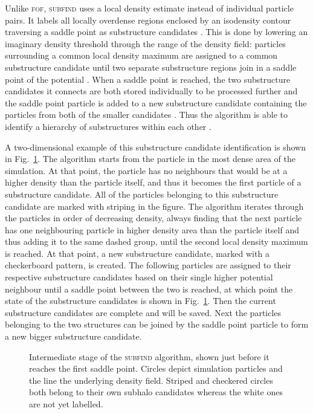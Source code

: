 \documentclass[english, oneside]{HYgradu}
\begin{document}
Unlike \textsc{fof}, \textsc{subfind} uses a local density estimate instead of individual particle pairs. It labels all locally overdense regions enclosed by an isodensity contour traversing a saddle point as substructure candidates \citep{springel2001populating}. This is done by lowering an imaginary density threshold through the range of the density field: particles surrounding a common local density maximum are assigned to a common substructure candidate until two separate substructure regions join in a saddle point of the potential \citep{springel2001populating}. When a saddle point is reached, the two substructure candidates it connects are both stored individually to be processed further and the saddle point particle is added to a new substructure candidate containing the particles from both of the smaller candidates \citep{springel2001populating}. Thus the algorithm is able to identify a hierarchy of substructures within each other \citep{springel2001populating}.

A two-dimensional example of this substructure candidate identification is shown in Fig.\ \ref{fig:subfind}. The algorithm starts from the particle in the most dense area of the simulation. At that point, the particle has no neighbours that would be at a higher density than the particle itself, and thus it becomes the first particle of a substructure candidate. All of the particles belonging to this substructure candidate are marked with striping in the figure. The algorithm iterates through the particles in order of decreasing density, always finding that the next particle has one neighbouring particle in higher density area than the particle itself and thus adding it to the same dashed group, until the second local density maximum is reached. At that point, a new substructure candidate, marked with a checkerboard pattern, is created. The following particles are assigned to their respective substructure candidates based on their single higher potential neighbour until a saddle point between the two is reached, at which point the state of the substructure candidates is shown in Fig.\ \ref{fig:subfind}. Then the current substructure candidates are complete and will be saved. Next the particles belonging to the two structures can be joined by the saddle point particle to form a new bigger substructure candidate.

\begin{figure}
    \centering
    
    \caption{Intermediate stage of the \textsc{subfind} algorithm, shown just before it reaches the first saddle point. Circles depict simulation particles and the line the underlying density field. Striped and checkered circles both belong to their own subhalo candidates whereas the white ones are not yet labelled.}\label{fig:subfind}
\end{figure}
\end{document}
